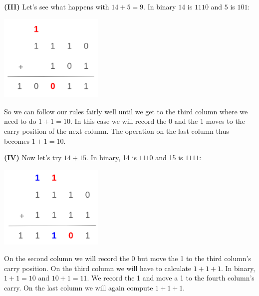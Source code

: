 \documentclass[12pt]{article}
\begin{document}
	\hspace{0.45cm}
	\begin{minipage}[t]{.5\linewidth} 
	\par\noindent \textbf{(III)} Let's see what happens with \(14 + 5 = 9\). In binary \(14\) is \(1110\) and \(5\) is \(101\):
	\begin{center}
		\includegraphics[width=5cm]{bin-add-2.png}
	\end{center}
	\par\noindent So we can follow our rules fairly well until we get to the third column where we need to do \(1+1=10\). In this case we will record the \(0\) and the 1 moves to the carry position of the next column. The operation on the last column thus becomes \(1+1=10\).
	\newline
	\par\noindent \textbf{(IV)} Now let's try \(14 + 15\). In binary, 14 is \(1110\) and 15 is \(1111\):
		\begin{center}
		\includegraphics[width=5cm]{bin-add-3.png}
	\end{center}
	
	\par\noindent On the second column we will record the 0 but move the 1 to the third column's carry position. On the third column we will have to calculate \(1+1+1\). In binary, \(1+1 = 10\) and \(10+1=11\). We record the 1 and move a 1 to the fourth column's carry. On the last column we will again compute \(1+1+1\).
	
	\end{minipage}
\end{document}
